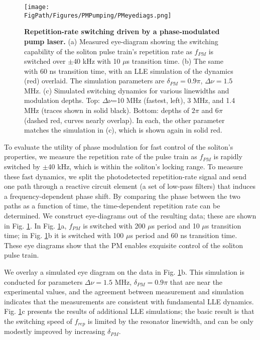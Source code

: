 \begin{figure}[htpb]
	\begin{center}
		\texttt{[image: \\FigPath/Figures/PMPumping/PMeyediags.png]}
	\end{center}
	\caption[Repetition-rate switching driven by a phase-modulated pump laser]{\textbf{Repetition-rate switching driven by a phase-modulated pump laser.} (a) Measured eye-diagram showing the switching capability of the soliton pulse train's repetition rate as $f_{PM}$ is switched over $\pm$40 kHz with 10 $\mu$s transition time. (b) The same with 60 ns transition time, with an LLE simulation of the dynamics (red) overlaid. The simulation parameters are $\delta_{PM}=0.9\pi$, $\Delta\nu=1.5$ MHz. (c) Simulated switching dynamics for various linewidths and modulation depths. Top: $\Delta\nu$=10 MHz (fastest, left), 3 MHz, and 1.4 MHz (traces shown in solid black). Bottom: depths of $2\pi$ and $6\pi$ (dashed red, curves nearly overlap). In each, the other parameter matches the simulation in (c), which is shown again in solid red. }
	\label{fig:PMeyediags}
\end{figure} 

To evaluate the utility of phase modulation for fast control of the soliton's properties, we measure the repetition rate of the pulse train as $f_{PM}$ is rapidly switched by $\pm$40 kHz, which is within the soliton's locking range.  To measure these fast dynamics, we split the photodetected repetition-rate signal and send one path through a reactive circuit element (a set of low-pass filters) that induces a frequency-dependent phase shift. By comparing the phase between the two paths as a function of time, the time-dependent repetition rate can be determined. We construct eye-diagrams out of the resulting data; these are shown in Fig. \ref{fig:PMeyediags}. In Fig. \ref{fig:PMeyediags}a, $f_{PM}$ is switched with 200 $\mu$s period and 10 $\mu$s transition time; in Fig. \ref{fig:PMeyediags}b it is switched with 100 $\mu$s period and 60 ns transition time. These eye diagrams show that the PM enables exquisite control of the soliton pulse train.

We overlay a simulated eye diagram on the data in Fig. \ref{fig:PMeyediags}b. This simulation is conducted for parameters $\Delta\nu=1.5$ MHz, $\delta_{PM}=0.9\pi$ that are near the experimental values, and the agreement between measurement and simulation indicates that the measurements are consistent with fundamental LLE dynamics. Fig. \ref{fig:PMeyediags}c presents the results of additional LLE simulations; the basic result is that the switching speed of $f_{rep}$ is limited by the resonator linewidth, and can be only modestly improved by increasing $\delta_{PM}$. 



